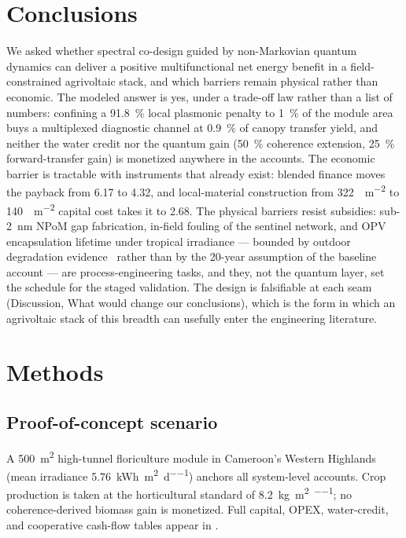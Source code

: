 \documentclass[preprint,12pt]{elsarticle}
\begin{document}
\section{Conclusions}

We asked whether spectral co-design guided by non-Markovian quantum dynamics can deliver a positive multifunctional net energy benefit in a field-constrained agrivoltaic stack, and which barriers remain physical rather than economic. The modeled answer is yes, under a trade-off law rather than a list of numbers: confining a \qty{91.8}{\percent} local plasmonic penalty to \qty{1}{\percent} of the module area buys a multiplexed diagnostic channel at \qty{0.9}{\percent} of canopy transfer yield, and neither the water credit nor the quantum gain (\qty{50}{\percent} coherence extension, \qty{25}{\percent} forward-transfer gain) is monetized anywhere in the accounts. The economic barrier is tractable with instruments that already exist: blended finance moves the payback from \qty{6.17}{\yr} to \qty{4.32}{\yr}, and local-material construction from \qty{322}{\USD\per\m\squared} to \qty{140}{\USD\per\m\squared} capital cost takes it to \qty{2.68}{\yr}. The physical barriers resist subsidies: sub-\qty{2}{\nano\meter} NPoM gap fabrication, in-field fouling of the sentinel network, and OPV encapsulation lifetime under tropical irradiance --- bounded by outdoor degradation evidence~\cite{Zhang2018,Kettle2022} rather than by the 20-year assumption of the baseline account --- are process-engineering tasks, and they, not the quantum layer, set the schedule for the staged validation. The design is falsifiable at each seam (Discussion, What would change our conclusions), which is the form in which an agrivoltaic stack of this breadth can usefully enter the engineering literature.


\section{Methods}

\subsection{Proof-of-concept scenario}\label{sec:methods_poc}
A \qty{500}{\m\squared} high-tunnel floriculture module in Cameroon's Western Highlands (mean irradiance \qty{5.76}{\kWh\per\m\squared\per\day}) anchors all system-level accounts. Crop production is taken at the horticultural standard of \qty{8.2}{\kg\per\m\squared\per\yr}; no coherence-derived biomass gain is monetized. Full capital, OPEX, water-credit, and cooperative cash-flow tables appear in .
\end{document}

